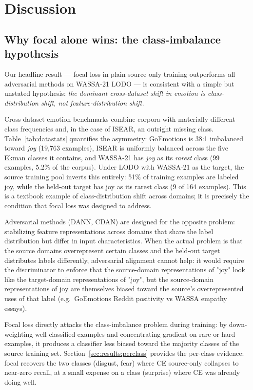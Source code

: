 \section{Discussion}
\label{sec:discussion}

\subsection{Why focal alone wins: the class-imbalance hypothesis}
\label{sec:discussion:imbalance}

Our headline result — focal loss in plain source-only training
outperforms all adversarial methods on WASSA-21 LODO — is consistent
with a simple but unstated hypothesis: \emph{the dominant cross-dataset
shift in emotion is class-distribution shift, not feature-distribution
shift.}

Cross-dataset emotion benchmarks combine corpora with materially
different class frequencies and, in the case of ISEAR, an outright
missing class. Table~\ref{tab:datastats} quantifies the asymmetry:
GoEmotions is 38:1 imbalanced toward \emph{joy} (19{,}763 examples),
ISEAR is uniformly balanced across the five Ekman classes it
contains, and WASSA-21 has \emph{joy} as its \emph{rarest} class
(99 examples, 5.2\% of the corpus). Under LODO with WASSA-21 as the
target, the source training pool inverts this entirely: 51\% of
training examples are labeled joy, while the held-out target has joy
as its rarest class (9 of 164 examples). This is a textbook example
of class-distribution shift across domains; it is precisely the
condition that focal loss \citep{lin2017focal} was designed to
address.

Adversarial methods (DANN, CDAN) are designed for the opposite
problem: stabilizing feature representations across domains that
share the label distribution but differ in input characteristics.
When the actual problem is that the source domains overrepresent
certain classes and the held-out target distributes labels
differently, adversarial alignment cannot help: it would require the
discriminator to enforce that the source-domain representations of
"joy" look like the target-domain representations of "joy", but the
source-domain representations of joy are themselves biased toward
the source's overrepresented uses of that label (e.g.\ GoEmotions
Reddit positivity vs WASSA empathy essays).

Focal loss directly attacks the class-imbalance problem during
training: by down-weighting well-classified examples and concentrating
gradient on rare or hard examples, it produces a classifier less
biased toward the majority classes of the source training set.
Section~\ref{sec:results:perclass} provides the per-class evidence:
focal recovers the two classes (disgust, fear) where CE source-only
collapses to near-zero recall, at a small expense on a class
(surprise) where CE was already doing well.

